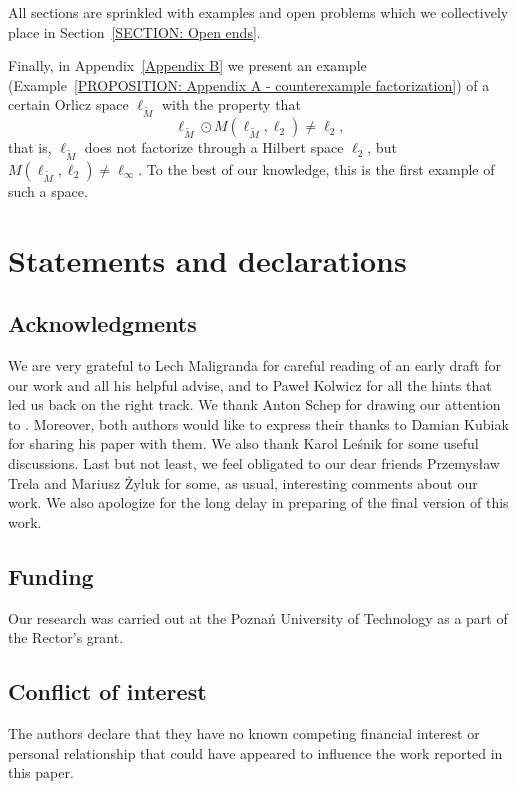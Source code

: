 \documentclass[11pt]{amsart}
\theoremstyle{definition}
\theoremstyle{definition}
\theoremstyle{definition}
\theoremstyle{definition}
\theoremstyle{definition}
\theoremstyle{definition}
\theoremstyle{definition}
\theoremstyle{definition}
\numberwithin{equation}{section}
\numberwithin{equation}{section}
\numberwithin{equation}{section}
\theoremstyle{definition}
\theoremstyle{definition}
\theoremstyle{definition}
\theoremstyle{definition}
\theoremstyle{definition}
\theoremstyle{definition}
\begin{document}
All sections are sprinkled with examples and open problems which we collectively place in Section~\ref{SECTION: Open ends}.

Finally, in Appendix~\ref{Appendix B} we present an example (Example~\ref{PROPOSITION: Appendix A - counterexample factorization})
of a certain Orlicz space $\ell_{\widetilde{M}}$ with the property that
\begin{equation*}
	\ell_{\widetilde{M}} \odot M(\ell_{\widetilde{M}},\ell_2) \neq \ell_2,
\end{equation*}
that is, $\ell_{\widetilde{M}}$ does not factorize through a Hilbert space $\ell_2$, but $M(\ell_{\widetilde{M}}, \ell_2) \neq \ell_{\infty}$.
To the best of our knowledge, this is the first example of such a space.

\section{{\bf Statements and declarations}}

\subsection{Acknowledgments}
We are very grateful to Lech Maligranda for careful reading of an early draft for our work and all his helpful advise,
and to Pawe{\l} Kolwicz for all the hints that led us back on the right track.
We thank Anton Schep for drawing our attention to \cite{PS88}.
Moreover, both authors would like to express their thanks to Damian Kubiak for sharing his paper \cite{Kub14} with them.
We also thank Karol Le{\' s}nik for some useful discussions.
Last but not least, we feel obligated to our dear friends Przemys{\l}aw Trela and Mariusz {\. Z}yluk for some, as usual,
interesting comments about our work.
We also apologize for the long delay in preparing of the final version of this work.

\subsection{Funding}
Our research was carried out at the Pozna{\' n} University of Technology as a part of the Rector's grant.

\subsection{Conflict of interest}
The authors declare that they have no known competing financial interest or personal relationship that could have appeared
to influence the work reported in this paper.
\end{document}
